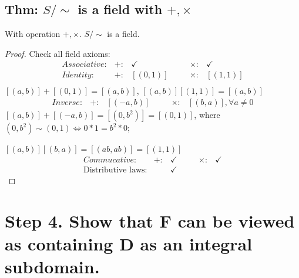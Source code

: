 \documentclass[11pt]{elegantbook}
\begin{document}
\subsection{Thm: $S/\sim$ is a field with $+,\times$}
\begin{theorem}
    With operation $+,\times$. $S/\sim$ is a field.
\end{theorem}
\begin{proof}
Check all field axioms:
\begin{equation}
    \begin{aligned}
        Associative:& +:&\checkmark&\quad&\times:& \checkmark\\
        Identity:& +:&[(0,1)]&\quad&\times:& [(1,1)]\\
    \end{aligned}
    \nonumber
\end{equation}
$[(a,b)]+[(0,1)]=[(a,b)]$, $[(a,b)][(1,1)]=[(a,b)]$
\begin{equation}
    \begin{aligned}
        Inverse:& +:&[(-a,b)]&\quad&\times:& [(b,a)],\forall a\neq 0
    \end{aligned}
    \nonumber
\end{equation}
$[(a,b)]+[(-a,b)]=[(0,b^2)]=[(0,1)]$, where $(0,b^2)\sim (0,1) \Leftrightarrow 0*1=b^2*0$;

$[(a,b)][(b,a)]=[(ab,ab)]=[(1,1)]$
\begin{equation}
    \begin{aligned}
        Commucative:& +:&\checkmark&\quad&\times:& \checkmark\\
        \text{Distributive laws}:&&\checkmark&&&
    \end{aligned}
    \nonumber
\end{equation}
\end{proof}

\section{Step 4. Show that F can be viewed as containing D as an integral subdomain.}
\end{document}
